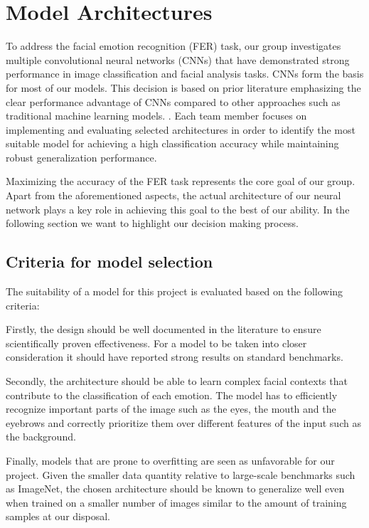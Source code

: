\section{Model Architectures}
\label{sec:architecture}

To address the facial emotion recognition (FER) task, our group investigates multiple
convolutional neural networks (CNNs) that have demonstrated strong performance in image
classification and facial analysis tasks. CNNs form the basis for most of our models. This 
decision is based on prior literature emphasizing the clear performance advantage of 
CNNs compared to other approaches such as traditional machine learning models.
\cite{Dong_2024}. Each team member focuses on implementing and evaluating selected
architectures in order to identify the most suitable model for achieving a high 
classification accuracy while maintaining robust generalization performance.

Maximizing the accuracy of the FER task represents the core goal of our group. Apart 
from the aforementioned aspects, the actual architecture of our neural network plays 
a key role in achieving this goal to the best of our ability. In the following section 
we want to highlight our decision making process.

\subsection{Criteria for model selection}

The suitability of a model for this project is evaluated based on the following 
criteria:

Firstly, the design should be well documented in the literature to ensure scientifically 
proven effectiveness. For a model to be taken into closer consideration it should have 
reported strong results on standard benchmarks.

Secondly, the architecture should be able to learn complex facial contexts that contribute 
to the classification of each emotion. The model has to efficiently recognize important parts 
of the image such as the eyes, the mouth and the eyebrows and correctly prioritize them over 
different features of the input such as the background.

Finally, models that are prone to overfitting are seen as unfavorable for our project. 
Given the smaller data quantity relative to large-scale benchmarks such as ImageNet,
the chosen architecture should be known to generalize well even when trained on a smaller 
number of images similar to the amount of training samples at our disposal.

